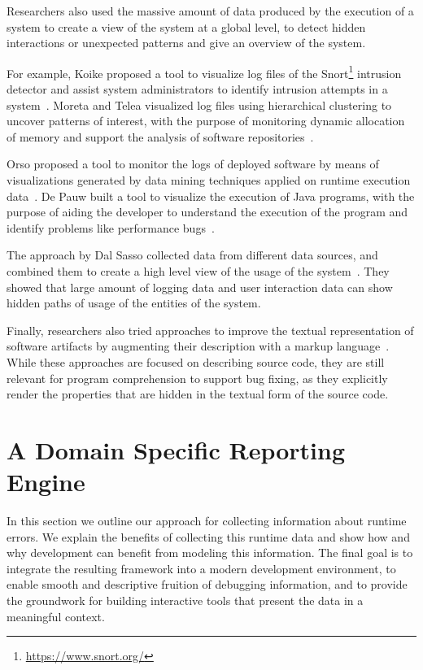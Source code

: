 Researchers also used the massive amount of data produced by the execution of a system to create a view of the system at a global level, to detect hidden interactions or unexpected patterns and give an overview of the system.

For example, Koike proposed a tool to visualize log files of the Snort\footnote{\url{https://www.snort.org/}} intrusion detector and assist system administrators to identify intrusion attempts in a system~\cite{Koik2004}.
Moreta and Telea visualized log files using hierarchical clustering to uncover patterns of interest, with the purpose of monitoring dynamic allocation of memory and support the analysis of software repositories~\cite{More2007}.

Orso \etal proposed a tool to monitor the logs of deployed software by means of visualizations generated by data mining techniques applied on runtime execution data~\cite{Orso2003}. De Pauw \etal built a tool to visualize the execution of Java programs, with the purpose of aiding the developer to understand the execution of the program and identify problems like performance bugs~\cite{De2002}.

The approach by Dal Sasso \etal collected data from different data sources, and combined them to create a high level view of the usage of the system~\cite{DalS2015b}. They showed that large amount of logging data and user interaction data can show hidden paths of usage of the entities of the system.

Finally, researchers also tried approaches to improve the textual representation of software artifacts by augmenting their description with a markup language~\cite{Badr2000,Male2002a}. While these approaches are focused on describing source code, they are still relevant for program comprehension to support bug fixing, as they explicitly render the properties that are hidden in the textual form of the source code.


\section{A Domain Specific Reporting Engine} \label{sec:framework}

In this section we outline our approach for collecting information about runtime errors. We explain the benefits of collecting this runtime data and show how and why development can benefit from modeling this information. The final goal is to integrate the resulting framework into a modern development environment, to enable smooth and descriptive fruition of debugging information, and to provide the groundwork for building interactive tools that present the data in a meaningful context.

